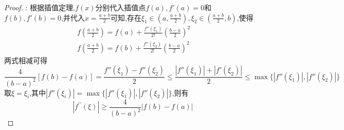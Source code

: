 \documentclass[lang=cn,newtx,10pt,scheme=chinese]{../Template/elegantbook}
\begin{document}
\begin{exercise}
\begin{proof}
    {\color{blue} }:
    根据插值定理,$f(x)$分别代入插值点$f(a),f'(a)=0$和$f(b),f'(b)=0$,并代入$x=\frac{a+b}{2}$可知,存在$\xi_1\in(a,\frac{a+b}{2}),\xi_2\in(\frac{a+b}{2},b)$,使得
    \begin{gather}
    f(\frac{a+b}{2})=f(a)+\frac{f''(\xi_1)}{2!}(\frac{b-a}{2})^2
    \nonumber
    \\
    f(\frac{a+b}{2})=f(b)+\frac{f''(\xi_2)}{2!}(\frac{b-a}{2})^2
    \nonumber
    \end{gather}
    两式相减可得
    \begin{equation}
    \frac{4}{(b-a)^2}[f(b)-f(a)]=\frac{f''(\xi_1)-f''(\xi_2)}{2}\leqslant \frac{|f''(\xi_1)|+|f'(\xi_2)|}{2}\leqslant \max\{|f''(\xi_1)|,|f''(\xi_2)|\}
        \nonumber
    \end{equation}
    取$\xi=\xi_i$,其中$|f''(\xi_i)|= \max\{|f''(\xi_1)|,|f''(\xi_2)|\}$,则有
    \begin{equation}
\left| f^{\prime\prime}(\xi ) \right|\ge \frac{4}{(b-a)^2}\left| f(b)-f(a) \right|\
        \nonumber
    \end{equation}
    \end{proof}
\end{exercise}
\end{document}
